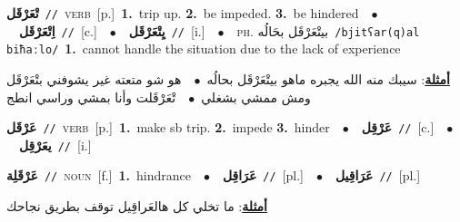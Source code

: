\documentclass[10pt,a4paper,twoside]{article} %
\begin{document}
\begin{multicols}{2}
{\setlength\topsep{0pt}\textbf{\foreignlanguage{arabic}{تْعَرْقَل}}\ {\color{gray}\texttt{//}\color{black}}\ \textsc{verb}\ [p.]\ \textbf{1.}~trip up.  \textbf{2.}~be impeded.  \textbf{3.}~be hindered\ \ $\bullet$\ \ \setlength\topsep{0pt}\textbf{\foreignlanguage{arabic}{اِتْعَرْقَل}}\ {\color{gray}\texttt{//}\color{black}}\ [c.]\ \ $\bullet$\ \ \setlength\topsep{0pt}\textbf{\foreignlanguage{arabic}{يِتْعَرْقَل}}\ {\color{gray}\texttt{//}\color{black}}\ [i.]\ \ $\bullet$\ \ \textsc{ph.} \color{gray} \foreignlanguage{arabic}{بيتْعَرْقَل بحَالُه}\color{black}\ {\color{gray}\texttt{/{\sffamily bjitʕar(q)al biħaːlo}/}\color{black}}\ \textbf{1.}~cannot handle the situation due to the lack of experience\  \begin{flushright}\color{gray}\foreignlanguage{arabic}{\textbf{\underline{\foreignlanguage{arabic}{أمثلة}}}: سيبك منه الله يجبره ماهو بيتْعَرْقَل بحالُه\ $\bullet$\ \  هو شو متعته غير يشوفني بتْعَرْقَل ومش ممشي بشغلي\ $\bullet$\ \  تْعَرْقَلت وأنا بمشي وراسي انطج}\end{flushright}\color{black}} \vspace{2mm}

{\setlength\topsep{0pt}\textbf{\foreignlanguage{arabic}{عَرْقَل}}\ {\color{gray}\texttt{//}\color{black}}\ \textsc{verb}\ [p.]\ \textbf{1.}~make sb trip.  \textbf{2.}~impede  \textbf{3.}~hinder\ \ $\bullet$\ \ \setlength\topsep{0pt}\textbf{\foreignlanguage{arabic}{عَرْقِل}}\ {\color{gray}\texttt{//}\color{black}}\ [c.]\ \ $\bullet$\ \ \setlength\topsep{0pt}\textbf{\foreignlanguage{arabic}{يعَرْقِل}}\ {\color{gray}\texttt{//}\color{black}}\ [i.]\ } \vspace{2mm}

{\setlength\topsep{0pt}\textbf{\foreignlanguage{arabic}{عَرْقَلِة}}\ {\color{gray}\texttt{//}\color{black}}\ \textsc{noun}\ [f.]\ \textbf{1.}~hindrance\ \ $\bullet$\ \ \setlength\topsep{0pt}\textbf{\foreignlanguage{arabic}{عَرَاقِل}}\ {\color{gray}\texttt{//}\color{black}}\ [pl.]\ \ $\bullet$\ \ \setlength\topsep{0pt}\textbf{\foreignlanguage{arabic}{عَرَاقِيل}}\ {\color{gray}\texttt{//}\color{black}}\ [pl.]\  \begin{flushright}\color{gray}\foreignlanguage{arabic}{\textbf{\underline{\foreignlanguage{arabic}{أمثلة}}}: ما تخلي كل هالعَراقِيل توقف بطريق نجاحك}\end{flushright}\color{black}} \vspace{2mm}


\end{multicols}
\end{document}

